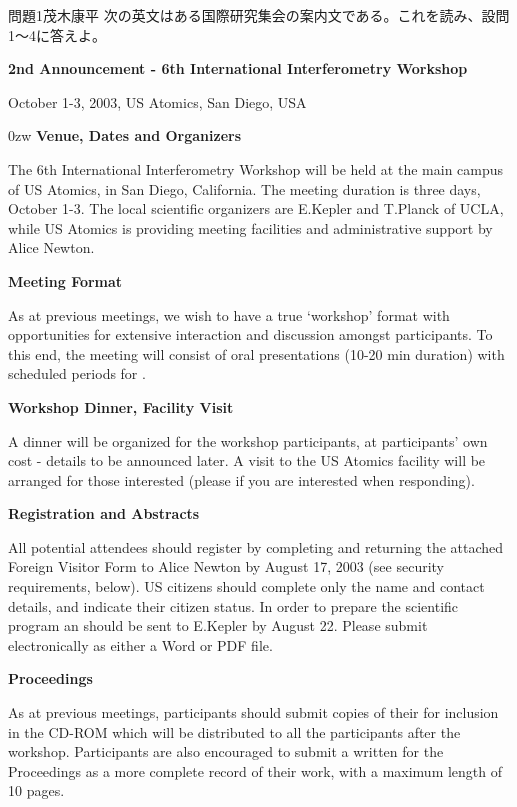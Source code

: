 \documentclass[fleqn]{jbook}
\begin{document}
\begin{question}{問題1}{茂木康平}
次の英文はある国際研究集会の案内文である。これを読み、設問1〜4に答えよ。

\begin{center}
    \bf
    2nd Announcement - 6th International Interferometry Workshop

    October 1-3, 2003, US Atomics, San Diego, USA
\end{center}

{\parindent 0zw
{\bf Venue, Dates and Organizers}

The 6th International Interferometry Workshop will be held at the main campus of US Atomics, in San Diego, California. The meeting duration is three days, October 1-3. The local scientific organizers are E.Kepler and T.Planck of UCLA, while US Atomics is providing meeting facilities and administrative support by Alice Newton.

{\bf Meeting Format}

As at previous meetings, we wish to have a true `workshop' format with opportunities for extensive interaction and discussion amongst participants. To this end, the meeting will consist of oral presentations (10-20 min duration) with scheduled periods for .

{\bf Workshop Dinner, Facility Visit}

A dinner will be organized for the workshop participants, at participants' own cost - details to be announced later. A visit to the US Atomics facility will be arranged for those interested (please  if you are interested when responding).

{\bf Registration and Abstracts}

All potential attendees should register by completing and returning the attached Foreign Visitor Form to Alice Newton by August 17, 2003 (see security requirements, below). US citizens should complete only the name and contact details, and indicate their citizen status. In order to prepare the scientific program an  should be sent to E.Kepler by August 22. Please submit electronically as either a Word or PDF file.

{\bf Proceedings}

As at previous meetings, participants should submit copies of their  for inclusion in the CD-ROM which will be distributed to all the participants after the workshop. Participants are also encouraged to submit a written  for the Proceedings as a more complete record of their work, with a maximum length of 10 pages.

}
\end{question}
\end{document}
